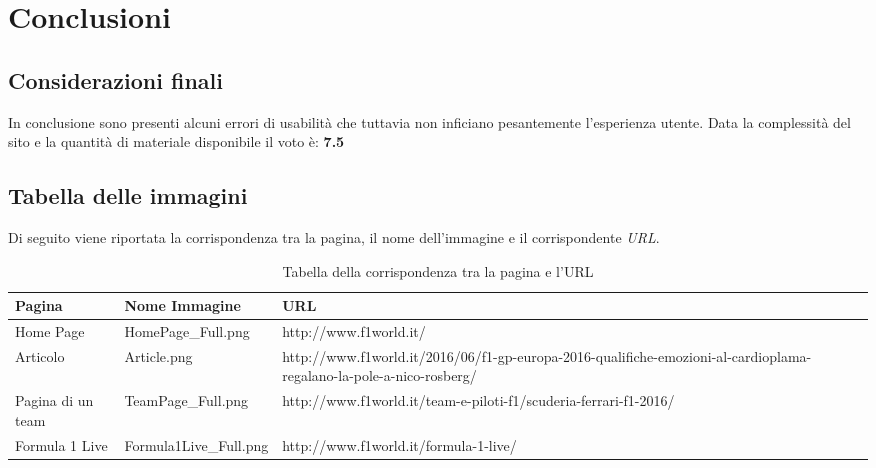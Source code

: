 \section{Conclusioni}

\subsection{Considerazioni finali}

In conclusione sono presenti alcuni errori di usabilità che tuttavia non
inficiano pesantemente l'esperienza utente. Data la complessità del sito
e la quantità di materiale disponibile il voto è: \textbf{7.5}

\subsection{Tabella delle immagini}

Di seguito viene riportata la corrispondenza tra la pagina, il nome
dell'immagine e il corrispondente \textit{URL}.

\begin{center}
  \begin{table}[H]
    \centering
    \begin{tabular}{| p{3cm} | p{4cm} | p{8cm} |}
      \hline
      \textbf{Pagina} & \textbf{Nome Immagine} & \textbf{URL} \tabularnewline \hline
		Home Page         & HomePage\_Full.png     & http://www.f1world.it/ \tabularnewline \hline
		Articolo          & Article.png            & http://www.f1world.it/2016/06/f1-gp-europa-2016-qualifiche-emozioni-al-cardioplama-regalano-la-pole-a-nico-rosberg/  \tabularnewline \hline
		Pagina di un team & TeamPage\_Full.png     & http://www.f1world.it/team-e-piloti-f1/scuderia-ferrari-f1-2016/  \tabularnewline \hline
		Formula 1 Live    & Formula1Live\_Full.png & http://www.f1world.it/formula-1-live/ \tabularnewline \hline
    \end{tabular}
    \caption{Tabella della corrispondenza tra la pagina e l'URL}
  \end{table}
\end{center}
